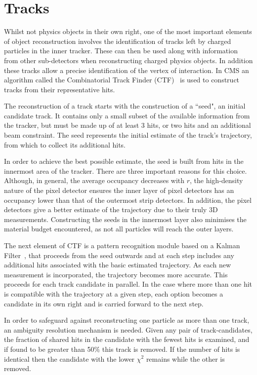 
 
\section{Tracks}
\label{sec:trk}

Whilst not physics objects in their own right, one of the most important elements of object reconstruction involves the identification of tracks left by charged particles in the inner tracker. These can then be used along with information from other sub-detectors when reconstructing charged physics objects. In addition these tracks allow a precise identification of the vertex of interaction. In CMS an algorithm called the Combinatorial Track Finder (CTF)~\cite{CTF} is used to construct tracks from their representative hits. 

The reconstruction of a track starts with the construction of a ``seed", an initial candidate track. It contains only a small subset of the available information from the tracker, but must be made up of at least 3 hits, or two hits and an additional beam constraint. The seed represents the initial estimate of the track's trajectory, from which to collect its additional hits. 

In order to achieve the best possible estimate, the seed is built from hits in the innermost area of the tracker. There are three important reasons for this choice. Although, in general, the average occupancy decreases with $r$, the high-density nature of the pixel detector ensures the inner layer of pixel detectors has an occupancy lower than that of the outermost strip detectors. In addition, the pixel detectors give a better estimate of the trajectory due to their truly 3D measurements. Constructing the seeds in the innermost layer also minimises the material budget encountered, as not all particles will reach the outer layers. 

The next element of CTF is a pattern recognition module based on a Kalman Filter~\cite{Kalman}, that proceeds from the seed outwards and at each step includes any additional hits associated with the basic estimated trajectory. As each new measurement is incorporated, the trajectory becomes more accurate. This proceeds for each track candidate in parallel. In the case where more than one hit is compatible with the trajectory at a given step, each option becomes a candidate in its own right and is carried forward to the next step.   

In order to safeguard against reconstructing one particle as more than one track, an ambiguity resolution mechanism is needed. Given any pair of track-candidates, the fraction of shared hits in the candidate with the fewest hits is examined, and if found to be greater than 50$\%$ this track is removed. If the number of hits is identical then the candidate with the lower $\chi^{2}$ remains while the other is removed. 

